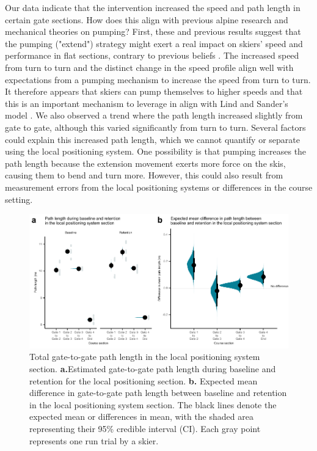 Our data indicate that the intervention increased the speed and path length in certain gate sections. How does this align with previous alpine research and mechanical theories on pumping? First, these and previous results suggest that the pumping ("extend") strategy might exert a real impact on skiers' speed and performance in flat sections, contrary to previous beliefs \cite{supej_differential_2008, supej_doba_2001}. The increased speed from turn to turn and the distinct change in the speed profile align well with expectations from a pumping mechanism to increase the speed from turn to turn. It therefore appears that skiers can pump themselves to higher speeds and that this is an important mechanism to leverage in align with Lind and Sander's model \cite{lind_physics_2004}. We also observed a trend where the path length increased slightly from gate to gate, although this varied significantly from turn to turn. Several factors could explain this increased path length, which we cannot quantify or separate using the local positioning system. One possibility is that pumping increases the path length because the extension movement exerts more force on the skis, causing them to bend and turn more. However, this could also result from measurement errors from the local positioning systems or differences in the course setting.


\begin{figure}
    \centering
    \includegraphics[width=1\linewidth]{figure/figure_path5_2.pdf}
    \caption{Total gate-to-gate path length in the local positioning system section. \textbf{a.}Estimated gate-to-gate path length during baseline and retention for the local positioning section. \textbf{b.}
Expected mean difference in gate-to-gate path length between baseline and retention in the
local positioning system section. The black lines denote the expected mean or differences in
mean, with the shaded area representing their 95\% credible interval (CI). Each gray point
represents one run trial by a skier.}
    \label{fig:lps_path}
\end{figure}




